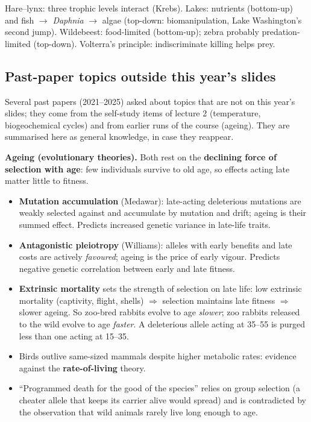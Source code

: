 \begin{chain}
Hare--lynx: three trophic levels interact (Krebs). Lakes: nutrients (bottom-up) and fish $\to$ \emph{Daphnia} $\to$ algae
(top-down: biomanipulation, Lake Washington's second jump). Wildebeest: food-limited (bottom-up); zebra probably
predation-limited (top-down). Volterra's principle: indiscriminate killing helps prey.
\end{chain}

\subsection{Past-paper topics outside this year's slides}
Several past papers (2021--2025) asked about topics that are not on this year's slides; they come from the self-study items
of lecture 2 (temperature, biogeochemical cycles) and from earlier runs of the course (ageing). They are summarised here as
general knowledge, in case they reappear.

\textbf{Ageing (evolutionary theories).} Both rest on the \textbf{declining force of selection with age}: few individuals
survive to old age, so effects acting late matter little to fitness.
\begin{itemize}
\item \textbf{Mutation accumulation} (Medawar): late-acting deleterious mutations are weakly selected against and
accumulate by mutation and drift; ageing is their summed effect. Predicts increased genetic variance in late-life traits.
\item \textbf{Antagonistic pleiotropy} (Williams): alleles with early benefits and late costs are actively \emph{favoured};
ageing is the price of early vigour. Predicts negative genetic correlation between early and late fitness.
\item \textbf{Extrinsic mortality} sets the strength of selection on late life: low extrinsic mortality (captivity, flight,
shells) $\Rightarrow$ selection maintains late fitness $\Rightarrow$ slower ageing. So zoo-bred rabbits evolve to age
\emph{slower}; zoo rabbits released to the wild evolve to age \emph{faster}. A deleterious allele acting at 35--55 is purged
less than one acting at 15--35.
\item Birds outlive same-sized mammals despite higher metabolic rates: evidence against the \textbf{rate-of-living} theory.
\item ``Programmed death for the good of the species'' relies on group selection (a cheater allele that keeps its carrier
alive would spread) and is contradicted by the observation that wild animals rarely live long enough to age.
\end{itemize}

